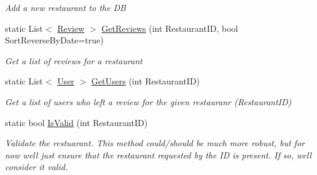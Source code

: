 \begin{DoxyCompactItemize}
\begin{DoxyCompactList}\small\item\em Add a new restaurant to the DB \end{DoxyCompactList}\item 
static List$<$ \hyperlink{class_restaurant_reviews_1_1_data_1_1_review}{Review} $>$ \hyperlink{class_restaurant_reviews_1_1_data_1_1_restaurant_a83e76d06f694a3a93caf35b0dd93a298}{Get\+Reviews} (int Restaurant\+ID, bool Sort\+Reverse\+By\+Date=true)
\begin{DoxyCompactList}\small\item\em Get a list of reviews for a restaurant \end{DoxyCompactList}\item 
static List$<$ \hyperlink{class_restaurant_reviews_1_1_data_1_1_user}{User} $>$ \hyperlink{class_restaurant_reviews_1_1_data_1_1_restaurant_a63bb7b59c2484b013a13fbde4627aa84}{Get\+Users} (int Restaurant\+ID)
\begin{DoxyCompactList}\small\item\em Get a list of users who left a review for the given restauranr (Restaurant\+ID) \end{DoxyCompactList}\item 
static bool \hyperlink{class_restaurant_reviews_1_1_data_1_1_restaurant_a28113bb9a1024cc2b682996ffa34f5ce}{Is\+Valid} (int Restaurant\+ID)
\begin{DoxyCompactList}\small\item\em Validate the restuarant. This method could/should be much more robust, but for now we\textquotesingle{}ll just ensure that the restaurant requested by the ID is present. If so, we\textquotesingle{}ll consider it valid. \end{DoxyCompactList}\end{DoxyCompactItemize}
